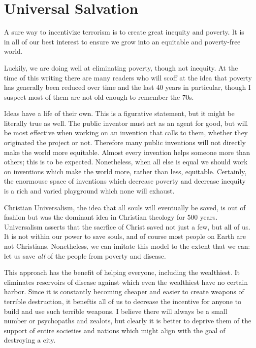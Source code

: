 \documentclass[
	fontsize=10pt, %
	twoside=false, %
	secnumdepth=1, %
]{kaobook}
\begin{document}
\chapter{Universal Salvation}

A sure way to incentivize terrorism is to create
great inequity and poverty.
It is in all of our best interest to ensure
we grow into an equitable and poverty-free world.

Luckily, we are doing well at eliminating poverty,
though not inequity.
At the time of this
writing there are many readers who will scoff at the
idea that poverty has generally been reduced over time
and the last 40 years in particular\cite{Pinker2019}, though I suspect most
of them are not old enough to remember the 70s.

Ideas have a life of their own.
This is a figurative statement, but it might be literally
true as well.
The public inventor must act as an agent for good, but
will be most effective when working on an invention that calls to them,
whether they originated the project or not.
Therefore many public inventions will not directly make the world more equitable.
Almost every invention helps someone more than others; this is to be
expected.
Nonetheless, when all else is equal we should work on inventions which
make the world more, rather than less, equitable.
Certainly, the enormouse space of inventions which decrease poverty
and decrease inequity is a rich and varied playground which
none will exhaust.

Christian Universalism, the idea that all souls will eventually be saved,
is out of fashion but was the dominant idea in Christian theology for
500 years\cite{hart2019all}.
Universalism asserts that the sacrfice of Christ saved not just a few,
but all of us.
It is not within our power to save souls, and of course most
people on Earth are not Christians.
Nonetheless, we can imitate this model to the extent that we can:
let us save {\em all} of the people from poverty and disease.

This approach has the benefit of helping everyone, including
the wealthiest.
It eliminates reservoirs of disease against which even the wealthiest
have no certain harbor.
Since it is constantly becoming cheaper and easier to create
weapons of terrible destruction, it beneftis all of us to
decrease the incentive for anyone to build and use such
terrible weapons.
I believe there will always be a small number or psychopaths
and zealots, but clearly it is better to deprive them
of the support of entire societies and nations which might
align with the goal of destroying a city.
\end{document}
